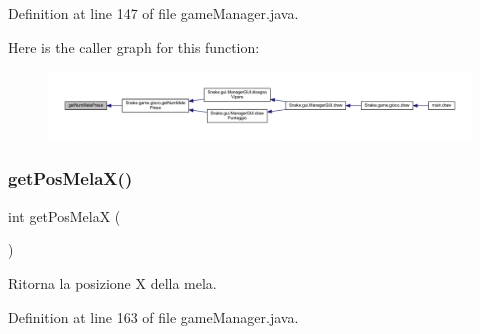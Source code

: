 Definition at line 147 of file game\+Manager.\+java.

Here is the caller graph for this function\+:
\nopagebreak
\begin{figure}[H]
\begin{center}
\leavevmode
\includegraphics[width=350pt]{class_snake_1_1game_1_1utility_1_1game_manager_a5af927824d6cd9c9c30b0607cbdab546_icgraph}
\end{center}
\end{figure}
\mbox{\label{class_snake_1_1game_1_1utility_1_1game_manager_aae6590f1c2572c796a9ea154e3b16b27}} 
\subsubsection{\texorpdfstring{get\+Pos\+Mela\+X()}{getPosMelaX()}}
{\footnotesize\ttfamily int get\+Pos\+MelaX (\begin{DoxyParamCaption}{ }\end{DoxyParamCaption})}



Ritorna la posizione X della mela. 



Definition at line 163 of file game\+Manager.\+java.

